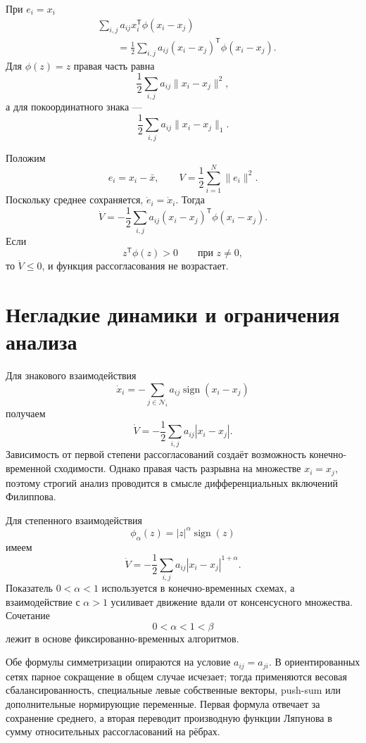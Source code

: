 При \(e_i=x_i\)
\[
\begin{aligned}
    &\sum_{i,j}
    a_{ij}x_i^{\mathsf T}\phi(x_i-x_j)
    \\
    &\qquad=
    \frac12
    \sum_{i,j}
    a_{ij}(x_i-x_j)^{\mathsf T}\phi(x_i-x_j).
\end{aligned}
\]
Для \(\phi(z)=z\) правая часть равна
\[
    \frac12\sum_{i,j}a_{ij}\lVert x_i-x_j\rVert^2,
\]
а для покоординатного знака ---
\[
    \frac12\sum_{i,j}a_{ij}\lVert x_i-x_j\rVert_1.
\]

Положим
\[
    e_i=x_i-\bar x,
    \qquad
    V=\frac12\sum_{i=1}^{N}\lVert e_i\rVert^2.
\]
Поскольку среднее сохраняется, \(\dot e_i=\dot x_i\). Тогда
\[
    \dot V
    =
    -\frac12
    \sum_{i,j}
    a_{ij}(x_i-x_j)^{\mathsf T}\phi(x_i-x_j).
\]
Если
\[
    z^{\mathsf T}\phi(z)>0
    \qquad\text{при }z\ne0,
\]
то \(\dot V\le0\), и функция рассогласования не возрастает.

\section{Негладкие динамики и ограничения анализа}

Для знакового взаимодействия
\[
    \dot x_i
    =
    -\sum_{j\in\mathcal N_i}
    a_{ij}\operatorname{sign}(x_i-x_j)
\]
получаем
\[
    \dot V
    =
    -\frac12
    \sum_{i,j}a_{ij}|x_i-x_j|.
\]
Зависимость от первой степени рассогласований создаёт возможность
конечно-временной сходимости. Однако правая часть разрывна на
множестве \(x_i=x_j\), поэтому строгий анализ проводится в смысле
дифференциальных включений Филиппова.

Для степенного взаимодействия
\[
    \phi_\alpha(z)
    =
    |z|^\alpha\operatorname{sign}(z)
\]
имеем
\[
    \dot V
    =
    -\frac12
    \sum_{i,j}a_{ij}|x_i-x_j|^{1+\alpha}.
\]
Показатель \(0<\alpha<1\) используется в конечно-временных схемах,
а взаимодействие с \(\alpha>1\) усиливает движение вдали от
консенсусного множества. Сочетание
\[
    0<\alpha<1<\beta
\]
лежит в основе фиксированно-временных алгоритмов.

Обе формулы симметризации опираются на условие
\(a_{ij}=a_{ji}\). В ориентированных сетях парное сокращение в общем
случае исчезает; тогда применяются весовая сбалансированность,
специальные левые собственные векторы, push-sum или дополнительные
нормирующие переменные. Первая формула отвечает за сохранение
среднего, а вторая переводит производную функции Ляпунова в сумму
относительных рассогласований на рёбрах.
